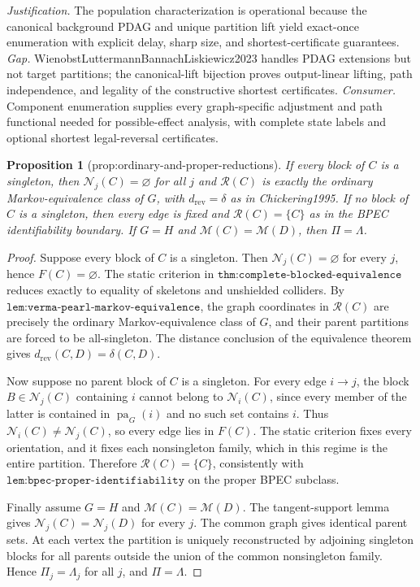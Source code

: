 \documentclass{article}
\newtheorem{proposition}{Proposition}
\begin{document}
\par\smallskip\noindent \textit{Justification.} The population characterization is operational because the canonical background PDAG and unique partition lift yield exact-once enumeration with explicit delay, sharp size, and shortest-certificate guarantees. \textit{Gap.} WienobstLuttermannBannachLiskiewicz2023 handles PDAG extensions but not target partitions; the canonical-lift bijection proves output-linear lifting, path independence, and legality of the constructive shortest certificates. \textit{Consumer.} Component enumeration supplies every graph-specific adjustment and path functional needed for possible-effect analysis, with complete state labels and optional shortest legal-reversal certificates.

\begin{proposition}[prop:ordinary-and-proper-reductions]\label{prop:ordinary-and-proper-reductions}
If every block of \(C\) is a singleton, then \(\mathcal N_j(C)=\varnothing\) for all \(j\) and \(\mathcal R(C)\) is exactly the ordinary Markov-equivalence class of \(G\), with \(d_{\mathrm{rev}}=\delta\) as in Chickering1995. If no block of \(C\) is a singleton, then every edge is fixed and \(\mathcal R(C)=\{C\}\) as in the BPEC identifiability boundary. If \(G=H\) and \(\mathcal M(C)=\mathcal M(D)\), then \(\Pi=\Lambda\).
\end{proposition}
\begin{proof}
Suppose every block of \(C\) is a singleton. Then \(\mathcal N_j(C)=\varnothing\) for every \(j\), hence \(F(C)=\varnothing\). The static criterion in \(\texttt{thm:complete-blocked-equivalence}\) reduces exactly to equality of skeletons and unshielded colliders. By \(\texttt{lem:verma-pearl-markov-equivalence}\), the graph coordinates in \(\mathcal R(C)\) are precisely the ordinary Markov-equivalence class of \(G\), and their parent partitions are forced to be all-singleton. The distance conclusion of the equivalence theorem gives \(d_{\mathrm{rev}}(C,D)=\delta(C,D)\).

Now suppose no parent block of \(C\) is a singleton. For every edge \(i\to j\), the block \(B\in\mathcal N_j(C)\) containing \(i\) cannot belong to \(\mathcal N_i(C)\), since every member of the latter is contained in \(\operatorname{pa}_G(i)\) and no such set contains \(i\). Thus \(\mathcal N_i(C)\neq\mathcal N_j(C)\), so every edge lies in \(F(C)\). The static criterion fixes every orientation, and it fixes each nonsingleton family, which in this regime is the entire partition. Therefore \(\mathcal R(C)=\{C\}\), consistently with \(\texttt{lem:bpec-proper-identifiability}\) on the proper BPEC subclass.

Finally assume \(G=H\) and \(\mathcal M(C)=\mathcal M(D)\). The tangent-support lemma gives \(\mathcal N_j(C)=\mathcal N_j(D)\) for every \(j\). The common graph gives identical parent sets. At each vertex the partition is uniquely reconstructed by adjoining singleton blocks for all parents outside the union of the common nonsingleton family. Hence \(\Pi_j=\Lambda_j\) for all \(j\), and \(\Pi=\Lambda\).
\end{proof}
\end{document}
